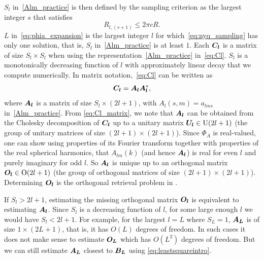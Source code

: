 $S_l$ in~\eqref{Alm_practice} is then defined by the sampling criterion as the largest integer
$s$ that satisfies \cite{cheng2013random}
\begin{equation}
\label{eq:nyq_sampling}
R_{l,(s+1)}\leq 2\pi cR.
\end{equation}
$L$ in~\eqref{eq:phia_expansion} is the largest integer $l$ for which~\eqref{eq:nyq_sampling} has only one solution, that is, $S_l$ in~\eqref{Alm_practice} is at least $1$.
Each $\boldsymbol{C}_{\boldsymbol{l}}$ is a matrix of size $S_l \times S_l$ when using the representation~\eqref{Alm_practice} in~\eqref{eq:Cl}. $S_l$ is a monotonically decreasing function of $l$ with approximately linear decay that we compute numerically. In
matrix notation,~\eqref{eq:Cl} can be written as
\begin{equation}
\label{eq:Cl_matrix}
\boldsymbol{C}_{\boldsymbol{l}}=\boldsymbol{A}_{\boldsymbol{l}} \boldsymbol{A}_{\boldsymbol{l}}^*, 
\end{equation}
where $\boldsymbol{A}_{\boldsymbol{l}}$ is a matrix of size
$S_l \times (2l+1)$, with $A_l(s,m) = a_{lms}$ in~\eqref{Alm_practice}. From \eqref{eq:Cl_matrix}, we note that $\boldsymbol{A}_{\boldsymbol{l}}$ can be 
obtained from the Cholesky 
decomposition of $\boldsymbol{C}_{\boldsymbol{l}}$ up to a unitary matrix $\boldsymbol{U}_{\boldsymbol{l}} \in \text{U}(2l+1)$ (the group of 
unitary matrices of size $(2l+1) \times (2l+1)$). Since $\Phi_A$ is real-valued, one can show using properties of its Fourier transform together with properties of the real spherical harmonics, that $A_{lm}(k)$ (and hence $\boldsymbol{A}_{\boldsymbol{l}}$) is real for even $l$ and purely imaginary for odd $l$. So $\boldsymbol{A}_{\boldsymbol{l}}$ is unique up to an orthogonal matrix $\boldsymbol{O}_{\boldsymbol{l}} \in \text{O}(2l+1)$ (the group of 
orthogonal matrices of size $(2l+1) \times (2l+1)$). Determining $\boldsymbol{O}_{\boldsymbol{l}}$ is the orthogonal retrieval problem in \cite{Bhamre2014}. 

If $S_l > 2l+1$, estimating the missing orthogonal matrix 
$\boldsymbol{O}_{\boldsymbol{l}}$ is equivalent to estimating $\boldsymbol{A}_{\boldsymbol{l}}$. Since $S_l$ is a decreasing function of $l$, for some large enough $l$ we would have $S_l < 2l+1$. For example, 
for the largest $l=L$ where $S_L=1$, $\boldsymbol{A}_{\boldsymbol{L}}$ is of size $1 \times (2L+1)$, that 
is, it has $O(L)$ degrees of freedom. In such cases it does not make 
sense to estimate $\boldsymbol{O}_{\boldsymbol{L}}$ which has $O(L^2)$ degrees of freedom. But we 
can still estimate $\boldsymbol{A}_{\boldsymbol{L}}$ closest to $\boldsymbol{B}_{\boldsymbol{L}}$ using \eqref{eq:leastsquareintro}. 


